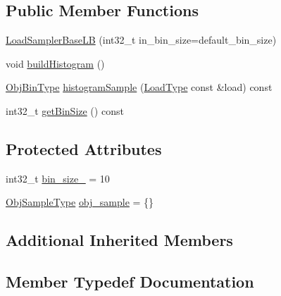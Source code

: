 \subsection*{Public Member Functions}
\begin{DoxyCompactItemize}
\item 
\hyperlink{structvt_1_1vrt_1_1collection_1_1lb_1_1_load_sampler_base_l_b_aab64749619cb27593054fd9997079f6c}{Load\+Sampler\+Base\+LB} (int32\+\_\+t in\+\_\+bin\+\_\+size=default\+\_\+bin\+\_\+size)
\item 
void \hyperlink{structvt_1_1vrt_1_1collection_1_1lb_1_1_load_sampler_base_l_b_a516efe2183a03fd5fec8122c11295b4c}{build\+Histogram} ()
\item 
\hyperlink{structvt_1_1vrt_1_1collection_1_1lb_1_1_load_sampler_base_l_b_acb55af31b27a3c248d351189abd78487}{Obj\+Bin\+Type} \hyperlink{structvt_1_1vrt_1_1collection_1_1lb_1_1_load_sampler_base_l_b_a7995a55d984d102c0d45d68f398b6ab7}{histogram\+Sample} (\hyperlink{namespacevt_a8fb51741340b87d7aaee0bef60e9896b}{Load\+Type} const \&load) const
\item 
int32\+\_\+t \hyperlink{structvt_1_1vrt_1_1collection_1_1lb_1_1_load_sampler_base_l_b_a4577bbd89d1005f17eb4064ab70034bc}{get\+Bin\+Size} () const
\end{DoxyCompactItemize}
\subsection*{Protected Attributes}
\begin{DoxyCompactItemize}
\item 
int32\+\_\+t \hyperlink{structvt_1_1vrt_1_1collection_1_1lb_1_1_load_sampler_base_l_b_ae3be6a0560eb24b5796ad3f3612c9524}{bin\+\_\+size\+\_\+} = 10
\item 
\hyperlink{structvt_1_1vrt_1_1collection_1_1lb_1_1_load_sampler_base_l_b_a8d939a849ec0d6371c1c4d441ffb9b94}{Obj\+Sample\+Type} \hyperlink{structvt_1_1vrt_1_1collection_1_1lb_1_1_load_sampler_base_l_b_afeeba35f0a0a1fa71dc438270303006f}{obj\+\_\+sample} = \{\}
\end{DoxyCompactItemize}
\subsection*{Additional Inherited Members}


\subsection{Member Typedef Documentation}
\mbox{\label{structvt_1_1vrt_1_1collection_1_1lb_1_1_load_sampler_base_l_b_a58de8f1e1204cf52b661b3906e2d9eeb}} 
